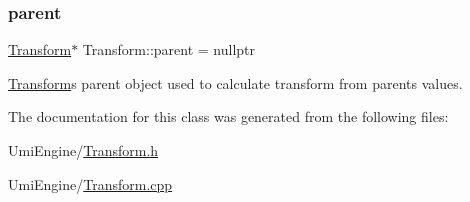 \subsubsection{\texorpdfstring{parent}{parent}}
{\footnotesize\ttfamily \mbox{\hyperlink{class_transform}{Transform}}$\ast$ Transform\+::parent = nullptr}



\mbox{\hyperlink{class_transform}{Transform}}\textquotesingle{}s parent object used to calculate transform from parent\textquotesingle{}s values. 



The documentation for this class was generated from the following files\+:\begin{DoxyCompactItemize}
\item 
Umi\+Engine/\mbox{\hyperlink{_transform_8h}{Transform.\+h}}\item 
Umi\+Engine/\mbox{\hyperlink{_transform_8cpp}{Transform.\+cpp}}\end{DoxyCompactItemize}

